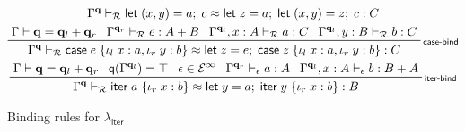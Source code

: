 \documentclass[acmsmall,screen,review]{acmart}
\newcommand{\mc}[1]{\ensuremath{\mathcal{#1}}}
\newcommand{\mb}[1]{\ensuremath{\mathbf{#1}}}
\newcommand{\ms}[1]{\ensuremath{\mathsf{#1}}}
\newcommand{\lto}{:}
\newcommand{\linl}[1]{\iota_l\;{#1}}
\newcommand{\linr}[1]{\iota_r\;{#1}}
\newcommand{\letexpr}[3]{\ensuremath{\ms{let}\;#1 = #2;\;#3}}
\newcommand{\caseexpr}[5]{\ms{case}\;#1\;\{\linl{#2} \lto #3, \linr{#4} \lto #5\}}
\newcommand{\liter}[3]{\ms{iter}\;#1\;\{ \linr{#2} \lto #3 \}}
\newcommand{\einf}[1]{#1 \in \mc{E}^\infty}
\newcommand{\qsp}[4]{#1 \vdash #2 = #3 + #4}
\newcommand{\rle}[1]{{\scriptsize\textsf{#1}}}
\newcommand{\hasty}[4]{#1 \vdash_{#2} #3: {#4}}
\newcommand{\teqv}{\approx}
\newcommand{\tmeq}[5]{#1 \vdash_{#2} #3 \teqv #4 : {#5}}
\newcommand{\subiterexp}{\texorpdfstring{\(\lambda_{\ms{iter}}\)}{lambda-iter}}
\newcommand{\alquant}{\ms{q}}
\begin{document}
\begin{figure}
\begin{adjustbox}{minipage=1.1\textwidth,scale=0.9}
\begin{gather*}
      {
        \tmeq{\Gamma^{\mb{q}}}{\mc{R}}
          {\letexpr{(x, y)}{a}{c}}
          {\letexpr{z}{a}{\letexpr{(x, y)}{z}{c}}}
          {C}
      } \\
    \prftree[r]{\rle{case-bind}}
      {\qsp{\Gamma}{\mb{q}}{\mb{q}_l}{\mb{q}_r}}
      {\hasty{\Gamma^{\mb{q}_r}}{\mc{R}}{e}{A + B}}
      {\hasty{\Gamma^{\mb{q}_l}, x : A}{\mc{R}}{a}{C}}
      {\hasty{\Gamma^{\mb{q}_l}, y : B}{\mc{R}}{b}{C}}
      {
        \tmeq{\Gamma^{\mb{q}}}{\mc{R}}
        {\caseexpr{e}{x}{a}{y}{b}}
        {\letexpr{z}{e}{\caseexpr{z}{x}{a}{y}{b}}}
        {C}
      } \\
    \prftree[r]{\rle{iter-bind}}
      {\qsp{\Gamma}{\mb{q}}{\mb{q}_l}{\mb{q}_r}}
      {\alquant(\Gamma^{\mb{q}_l}) = \top}
      {\einf{\epsilon}}
      {\hasty{\Gamma^{\mb{q}_r}}{\epsilon}{a}{A}}
      {\hasty{\Gamma^{\mb{q}_l}, x : A}{\epsilon}{b}{B + A}}
      {\tmeq{\Gamma^{\mb{q}}}{\mc{R}}{\liter{a}{x}{b}}{\letexpr{y}{a}{\liter{y}{x}{b}}}{B}}
  \end{gather*}
  \end{adjustbox}
  \caption{Binding rules for \subiterexp{}}
  \Description{}
  \label{fig:binding-rules}
\end{figure}
\end{document}
